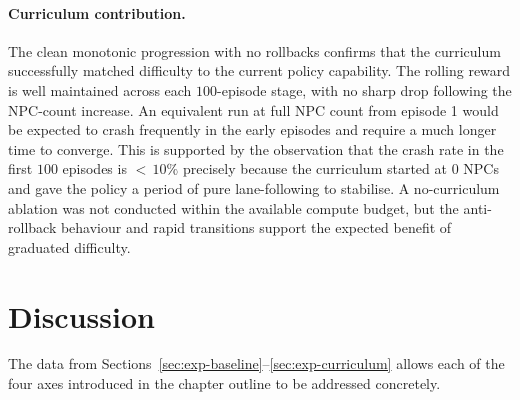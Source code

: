 \paragraph{Curriculum contribution.}
The clean monotonic progression with no rollbacks confirms that the curriculum
successfully matched difficulty to the current policy capability. The rolling reward is
well maintained across each \(100\)-episode stage, with no sharp drop following the
NPC-count increase. An equivalent run at full NPC count from episode 1 would be expected
to crash frequently in the early episodes and require a much longer time to converge.
This is supported by the observation that the crash rate in the first \(100\) episodes
is \(<\,10\%\) precisely because the curriculum started at \(0\) NPCs and gave the policy
a period of pure lane-following to stabilise. A no-curriculum ablation was not conducted
within the available compute budget, but the anti-rollback behaviour and rapid transitions
support the expected benefit of graduated difficulty.

\section{Discussion}\label{sec:exp-discussion}

The data from Sections~\ref{sec:exp-baseline}--\ref{sec:exp-curriculum} allows each of the
four axes introduced in the chapter outline to be addressed concretely.

